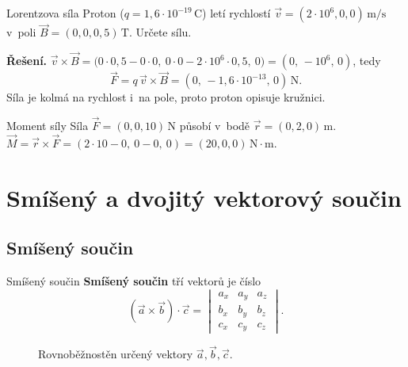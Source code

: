 \documentclass[a4paper,11pt]{article}
\newcommand{\jed}[1]{\,\mathrm{#1}}      %
\newcommand{\dc}{{,}}                    %
\begin{document}
\begin{priklad}{Lorentzova síla}
Proton ($q=1\dc6\cdot10^{-19}\jed{C}$) letí rychlostí $\vec v=(2\cdot10^{6},0,0)\jed{m/s}$
v~poli $\vec B=(0,0,0\dc5)\jed{T}$. Určete sílu.

\medskip\noindent\textbf{Řešení.}
$\vec v\times\vec B=\bigl(0\cdot0{,}5-0\cdot0,\ 0\cdot0-2\cdot10^6\cdot0{,}5,\ 0\bigr)=(0,\,-10^6,\,0)$, tedy
\[
  \vec F=q\,\vec v\times\vec B=(0,\,-1\dc6\cdot10^{-13},\,0)\jed{N}.
\]
Síla je kolmá na rychlost i~na pole, proto proton opisuje kružnici.
\end{priklad}

\begin{priklad}{Moment síly}
Síla $\vec F=(0,0,10)\jed{N}$ působí v~bodě $\vec r=(0,2,0)\jed{m}$.
$\vec M=\vec r\times\vec F=(2\cdot10-0,\ 0-0,\ 0)=(20,0,0)\jed{N\cdot m}$.
\end{priklad}

\section{Smíšený a dvojitý vektorový součin}

\subsection{Smíšený součin}\label{sec:smiseny}

\begin{definice}{Smíšený součin}
\textbf{Smíšený součin} tří vektorů je číslo
\begin{equation}
  (\vec a\times\vec b)\cdot\vec c=
  \begin{vmatrix}
    a_x&a_y&a_z\\ b_x&b_y&b_z\\ c_x&c_y&c_z
  \end{vmatrix}.
\end{equation}
\end{definice}

\begin{figure}[!htbp]
\centering
{}
\caption{Rovnoběžnostěn určený vektory $\vec a,\vec b,\vec c$.}
\end{figure}
\end{document}
